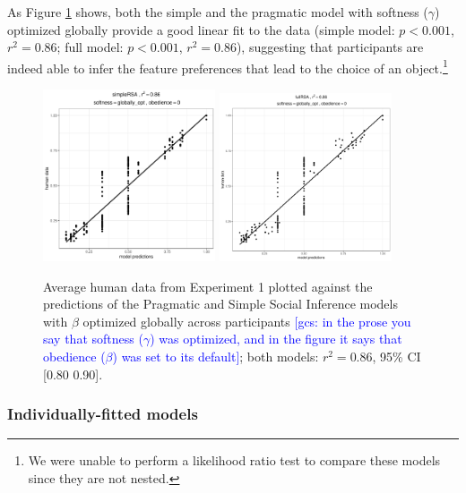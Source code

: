 \documentclass[10pt,a4paper]{article}
\newcommand{\gcs}[1]{\textcolor{blue}{[gcs: #1]}}
\begin{document}
As Figure \ref{simple-full} shows, both the simple and the pragmatic model with softness ($\gamma$) optimized globally provide a good linear fit to the data (simple model: $p < 0.001$, $r^2 = 0.86$; full model: $p < 0.001$, $r^2 = 0.86$), suggesting that participants are indeed able to infer the feature preferences that lead to the choice of an object.\footnote{We were unable to perform a likelihood ratio test to compare these models since they are not nested.}

\begin{figure}[ht]
	\centering
	\includegraphics[width=2in]{images/m13.pdf}
	\includegraphics[width=2in]{images/m23.pdf}
	\caption{Average human data from Experiment 1 plotted against the predictions of the Pragmatic and Simple Social Inference models with $\beta$ optimized globally across participants \gcs{in the prose you say that softness ($\gamma$) was optimized, and in the figure it says that obedience ($\beta$) was set to its default}; both models: $r^{2}=0.86$, 95\% CI [0.80 0.90].}\label{simple-full}
\end{figure}


\subsubsection{Individually-fitted models}
\end{document}
